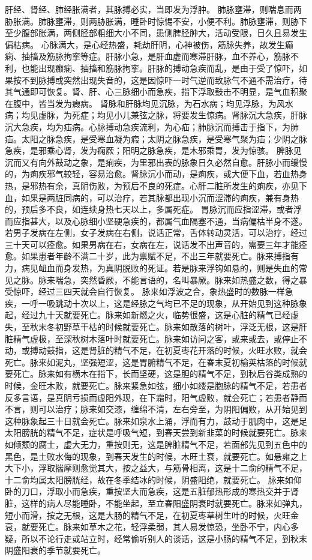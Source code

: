 \documentclass[a4paper,12pt,UTF8,twoside]{ctexbook}
\begin{document}
肝经、肾经、肺经胀满者，其脉搏必实，当即发为浮肿。
肺脉壅滞，则喘息而两胁胀满。肺脉壅滞，则两胁胀满，睡卧时惊惕不安，小便不利。肺脉壅滞，则胁下至少腹部胀满，两侧胫部粗细大小不同，患侧脾胫肿大，活动受限，日久且易发生偏枯病。
心脉满大，是心经热盛，耗劫肝阴，心神被伤，筋脉失养，故发生癫痫、抽搐及筋脉拘挛等症。肝脉小急，是肝血虚而寒滞肝脉，血不养心，筋脉不利，也能出现癫痫、抽搐和筋脉拘挛。肝脉的搏动急疾而乱，是由于受了惊吓，如果按不到脉搏或突然出现失音的，这是因惊吓一时气逆而致脉气不通不需治疗，待其气通即可恢复。肾、肝、心三脉细小而急疾，指下浮取鼓击不明显，是气血积聚在腹中，皆当发为瘕病。
肾脉和肝脉均见沉脉，为石水病；均见浮脉，为风水病；均见虚脉，为死症；均见小儿兼弦之脉，将要发生惊病。肾脉沉大急疾，肝脉沉大急疾，均为疝病。心脉搏动急疾流利，为心疝；肺脉沉而搏击于指下，为肺疝。太阳之脉急疾，是受寒血凝为瘕；太阴之脉急疾，是受寒气聚为疝；少阴之脉急疾，是邪乘心肾，发为痫厥；阳明之脉急疾，是木邪乘胃，发为惊骇。
脾脉见沉而又有向外鼓动之象，是痢疾，为里邪出表的脉象日久必然自愈。肝脉小而缓慢的，为痢疾邪气较轻，容易治愈。肾脉沉小而动，是痢疾，或大便下血，若血热身热，是邪热有余，真阴伤败，为预后不良的死症。心肝二脏所发生的痢疾，亦见下血，如果是两脏同病的，可以治疗，若其脉都出现小沉而涩滞的痢疾，兼有身热的，预后多不良，如连续身热七天以上，多属死症。
胃脉沉而应指涩滞，或者浮而应指甚大，以及心脉细小坚硬急疾的，都属气血隔塞不通，当病偏枯半身不遂。若男子发病在左侧，女子发病在右侧，说话正常，舌体转动灵活，可以治疗，经过三十天可以痊愈。如果男病在右，女病在左，说话发不出声音的，需要三年才能痊愈。如果患者年龄不满二十岁，此为禀赋不足，不出三年就要死亡。脉来搏指有力，病见衄血而身发热，为真阴脱败的死证。若是脉来浮钩如悬的，则是失血的常见之脉。脉来喘急，突然昏厥，不能言语的，名叫暴厥。脉来如热盛之数，得之暴受惊吓，经过三四天就会自行恢复。
脉来如浮波之合，象热盛时的数脉一样急疾，一呼一吸跳动十次以上，这是经脉之气均已不足的现象，从开始见到这种脉象起，经过九十天就要死亡。脉来如新燃之火，临势很盛，这是心脏的精气已经虚失，至秋末冬初野草干枯的时候就要死亡。脉来如散落的树叶，浮泛无根，这是肝脏精气虚极，至深秋树木落叶时就要死亡。脉来如访问之客，或来或去，或停止不动，或搏动鼓指，这是肾脏的精气不足，在初夏枣花开落的时候，火旺水败，就会死亡。脉来如泥丸，坚强短涩，这是胃腑精气不足，在春末夏初榆荚枯落的时候就要死亡。脉来如有横木在指下，长而坚硬，这是胆的精气不足，到秋后谷类成熟的时候，金旺木败，就要死亡。脉来紧急如弦，细小如缕是胞脉的精气不足，若患者反多言语，是真阴亏损而虚阳外现，在下霜时，阳气虚败，就会死亡；若患者静而不言，则可以治疗；脉来如交漆，缠绵不清，左右旁至，为阴阳偏败，从开始见到这种脉象起三十日就会死亡。脉来如泉水上涌，浮而有力，鼓动于肌肉中，这是足太阳膀胱的精气不足，症状是呼吸气短，到春天尝到新韭菜的时候就要死亡。脉来如倾颓的腐士，虚大无力，重按则无，这是脾脏精气不足，若面部先见到五色中的黑色，是土败水侮的现象，到春天发生的时候，木旺土衰，就要死亡。如悬雍之上大下小，浮取揣摩则愈觉其大，按之益大，与筋骨相离，这是十二俞的精气不足，十二俞均属太阳膀胱经，故在冬季结冰的时候，阴盛阳绝，就要死亡。
脉来如仰卧的刀口，浮取小而急疾，重按坚大而急疾，这是五脏郁热形成的寒热交并于肾脏，这样的病人尽能睡卧，不能坐起，至立春阳盛阴衰时就要死亡。脉来如弹丸，短小而滑，按之无根，这是大肠的精气不足，在初夏枣草树生叶的时候，火旺金衰，就要死亡。脉来如草木之花，轻浮柔弱，其人易发惊恐，坐卧不宁，内心多疑，所以不论行走或站立时，经常偷听别人的谈话，这是小肠的精气不足，到秋末阴盛阳衰的季节就要死亡。
\end{document}
